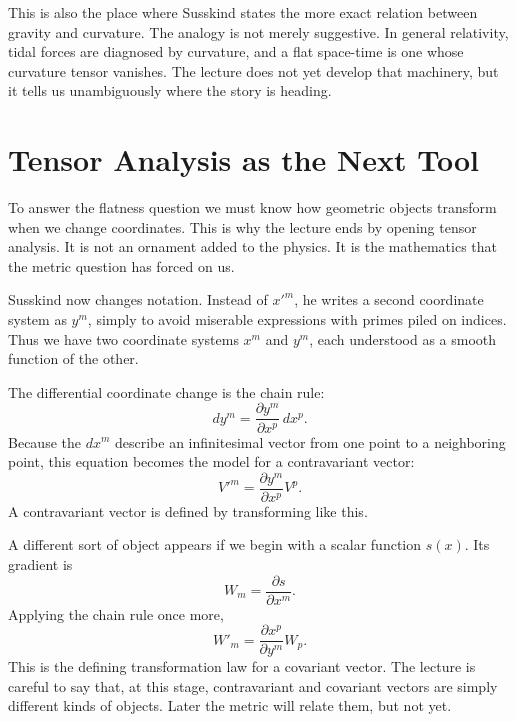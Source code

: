This is also the place where Susskind states the more exact relation between gravity and curvature.  The analogy is not merely suggestive.  In general relativity, tidal forces are diagnosed by curvature, and a flat space-time is one whose curvature tensor vanishes.  The lecture does not yet develop that machinery, but it tells us unambiguously where the story is heading.

\section{Tensor Analysis as the Next Tool}

To answer the flatness question we must know how geometric objects transform when we change coordinates.  This is why the lecture ends by opening tensor analysis.  It is not an ornament added to the physics.  It is the mathematics that the metric question has forced on us.

Susskind now changes notation.  Instead of \(x'^m\), he writes a second coordinate system as \(y^m\), simply to avoid miserable expressions with primes piled on indices.  Thus we have two coordinate systems \(x^m\) and \(y^m\), each understood as a smooth function of the other.

The differential coordinate change is the chain rule:
\begin{equation}
dy^m = \frac{\partial y^m}{\partial x^p}\,dx^p.
\end{equation}
Because the \(dx^m\) describe an infinitesimal vector from one point to a neighboring point, this equation becomes the model for a contravariant vector:
\begin{equation}
V'^m = \frac{\partial y^m}{\partial x^p}V^p.
\end{equation}
A contravariant vector is defined by transforming like this.

A different sort of object appears if we begin with a scalar function \(s(x)\).  Its gradient is
\begin{equation}
W_m = \frac{\partial s}{\partial x^m}.
\end{equation}
Applying the chain rule once more,
\begin{equation}
W'_m = \frac{\partial x^p}{\partial y^m}W_p.
\end{equation}
This is the defining transformation law for a covariant vector.  The lecture is careful to say that, at this stage, contravariant and covariant vectors are simply different kinds of objects.  Later the metric will relate them, but not yet.

